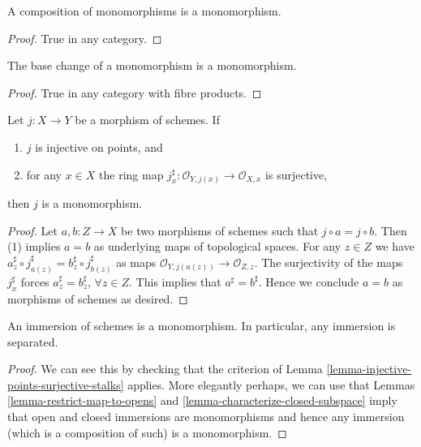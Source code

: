 \begin{lemma}
\label{lemma-composition-monomorphism}
A composition of monomorphisms is a monomorphism.
\end{lemma}

\begin{proof}
True in any category.
\end{proof}

\begin{lemma}
\label{lemma-base-change-monomorphism}
The base change of a monomorphism is a monomorphism.
\end{lemma}

\begin{proof}
True in any category with fibre products.
\end{proof}

\begin{lemma}
\label{lemma-injective-points-surjective-stalks}
Let $j : X \to Y$ be a morphism of schemes.
If
\begin{enumerate}
\item $j$ is injective on points, and
\item for any $x \in X$ the ring map
$j^\sharp_x : \mathcal{O}_{Y, j(x)} \to \mathcal{O}_{X, x}$
is surjective,
\end{enumerate}
then $j$ is a monomorphism.
\end{lemma}

\begin{proof}
Let $a, b : Z \to X$ be two morphisms of schemes such that
$j \circ a  = j \circ b$.
Then (1) implies $a = b$ as underlying
maps of topological spaces.
For any $z \in Z$ we have
$a^\sharp_z \circ j^\sharp_{a(z)} = b^\sharp_z \circ j^\sharp_{b(z)}$
as maps $\mathcal{O}_{Y, j(a(z))} \to \mathcal{O}_{Z, z}$.
The surjectivity of the maps
$j^\sharp_x$ forces $a^\sharp_z = b^\sharp_z$, $\forall z \in Z$.
This implies that $a^\sharp = b^\sharp$.
Hence we conclude $a = b$ as morphisms of schemes
as desired.
\end{proof}

\begin{lemma}
\label{lemma-immersions-monomorphisms}
An immersion of schemes is a monomorphism.
In particular, any immersion is separated.
\end{lemma}

\begin{proof}
We can see this by checking that the criterion of
Lemma \ref{lemma-injective-points-surjective-stalks} applies.
More elegantly perhaps, we can use that
Lemmas \ref{lemma-restrict-map-to-opens} and
\ref{lemma-characterize-closed-subspace} imply that
open and closed immersions are monomorphisms and hence
any immersion (which is a composition of such)
is a monomorphism.
\end{proof}

